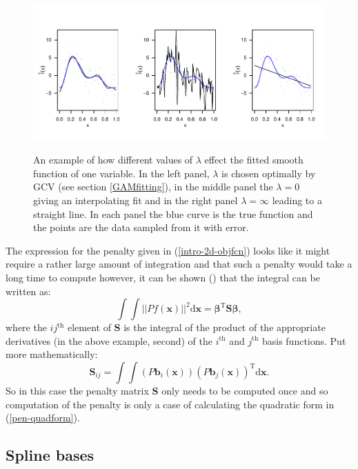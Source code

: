 \begin{figure}[tb]
\centering
\includegraphics[width=6in]{intro/figs/lambda-ex.pdf}\\
\caption{An example of how different values of $\lambda$ effect the fitted smooth function of one variable. In the left panel, $\lambda$ is chosen optimally by GCV (see section \ref{GAMfitting}), in the middle panel the $\lambda=0$ giving an interpolating fit and in the right panel $\lambda=\infty$ leading to a straight line. In each panel the blue curve is the true function and the points are the data sampled from it with error.}
\label{lambda-ex}
\end{figure}

The expression for the penalty given in (\ref{intro-2d-objfcn}) looks like it might require a rather large amount of integration and that such a penalty would take a long time to compute however, it can be shown (\cite[p. 126]{simonbook}) that the integral can be written as:
\begin{equation}
\int\int \lvert \lvert P f(\mathbf{x}) \rvert \rvert^2 \text{d}\mathbf{x} = \bm{\beta}^\text{T} \mathbf{S} \bm{\beta},
\end{equation}
where the $ij^\text{th}$ element of $\mathbf{S}$ is the integral of the product of the appropriate derivatives (in the above example, second) of the $i^\text{th}$ and $j^\text{th}$ basis functions. Put more mathematically:
\begin{equation}
\mathbf{S}_{ij} = \int \int \left(P\mathbf{b}_{i}(\mathbf{x})\right ) \left (P\mathbf{b}_{j}(\mathbf{x}) \right )^\text{T}  \text{d}\mathbf{x}.
\label{pen-quadform}
\end{equation}
So in this case the penalty matrix $\mathbf{S}$ only needs to be computed once and so computation of the penalty is only a case of calculating the quadratic form in (\ref{pen-quadform}).

\subsection{Spline bases}


